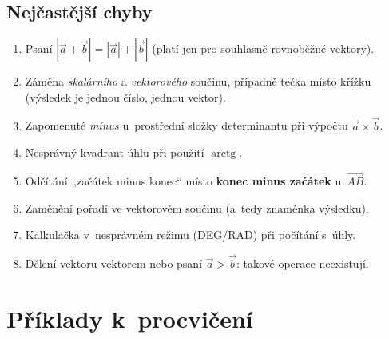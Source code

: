 \documentclass[a4paper,11pt]{article}
\newcommand{\abs}[1]{\left\lvert #1\right\rvert}
\begin{document}
\subsection{Nejčastější chyby}

\begin{enumerate}
  \item Psaní $\abs{\vec a+\vec b}=\abs{\vec a}+\abs{\vec b}$ (platí jen pro souhlasně rovnoběžné vektory).
  \item Záměna \emph{skalárního} a \emph{vektorového} součinu, případně tečka místo
        křížku (výsledek je jednou číslo, jednou vektor).
  \item Zapomenuté \emph{mínus} u~prostřední složky determinantu při výpočtu $\vec a\times\vec b$.
  \item Nesprávný kvadrant úhlu při použití $\operatorname{arctg}$.
  \item Odčítání „začátek minus konec“ místo \textbf{konec minus začátek} u~$\overrightarrow{AB}$.
  \item Zaměnění pořadí ve vektorovém součinu (a~tedy znaménka výsledku).
  \item Kalkulačka v~nesprávném režimu (DEG/RAD) při počítání s~úhly.
  \item Dělení vektoru vektorem nebo psaní $\vec a>\vec b$: takové operace neexistují.
\end{enumerate}

\section{Příklady k~procvičení}
\end{document}

